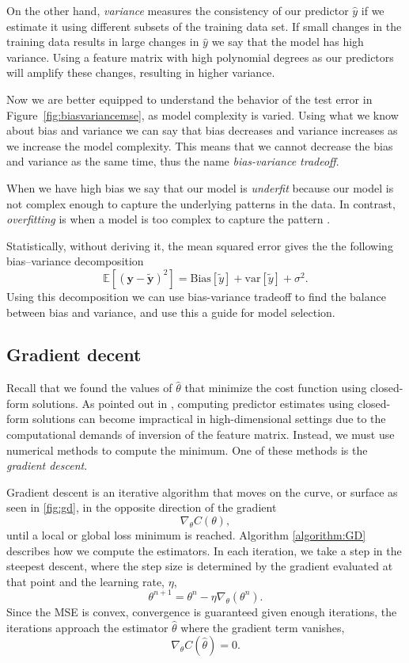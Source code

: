\documentclass[amssymb,twocolumn,aps]{revtex4}
\begin{document}
On the other hand, \textit{variance} measures the consistency of our predictor $\hat{y}$ if we estimate it using different subsets of the training data set. If small changes in the training data results in large changes in $\hat{y}$ we say that the model has high variance. Using a feature matrix with high polynomial degrees as our predictors will amplify these changes, resulting in higher variance.

Now we are better equipped to understand the behavior of the test error in Figure~\ref{fig:biasvariancemse}, as model complexity is varied. Using what we know about bias and variance we can say that bias decreases and variance increases as we increase the model complexity. This means that we cannot decrease the bias and variance as the same time, thus the name \textit{bias-variance tradeoff}. 

When we have high bias we say that our model is \textit{underfit} because our model is not complex enough to capture the underlying patterns in the data. In contrast, \textit{overfitting} is when a model is too complex to capture the pattern \cite{rasch3}.

Statistically, without deriving it, the mean squared error gives the the following bias–variance decomposition $$
\mathbb{E}\left[(\boldsymbol{y}-\boldsymbol{\tilde{y}})^2\right]=\mathrm{Bias}[\tilde{y}]+\mathrm{var}[\tilde{y}]+\sigma^2.
$$
Using this decomposition we can use bias-variance tradeoff to find the balance between bias and variance, and use this a guide for model selection. 


\subsection{Gradient decent}
\label{sec:gd}

Recall that we found the values of $\hat{\theta}$ that minimize the cost function using closed-form solutions. As pointed out in \cite{fysml3}, computing predictor estimates using closed-form solutions can become impractical in high-dimensional settings due to the computational demands of inversion of the feature matrix. Instead, we must use numerical methods to compute the minimum. One of these methods is the \textit{gradient descent}.

Gradient descent is an iterative algorithm that moves on the curve, or surface as seen in \autoref{fig:gd}, in the opposite direction of the gradient $$\nabla_\theta C(\theta),$$ until a local or global loss minimum is reached. Algorithm \autoref{algorithm:GD} describes how we compute the estimators. In each iteration, we take a step in the steepest descent, where the step size is determined by the gradient evaluated at that point and the learning rate, $\eta$,$$\theta^{n+1} = \theta^n - \eta\nabla_\theta(\theta^n).$$
Since the MSE is convex, convergence is guaranteed given enough iterations, the iterations approach the estimator $\hat{\theta}$ where the gradient  term vanishes, $$\nabla_\theta C(\hat{\theta}) = 0.$$
\end{document}
